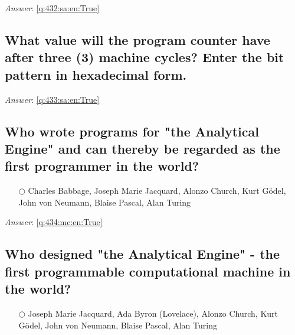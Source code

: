 \documentclass[a4paper,11pt,oneside]{article}
\begin{document}
\begin{sloppypar}
\label{q:432:sa:en:False}

\vspace{2cm}

\noindent\makebox[\textwidth]{\hrulefill}

\vspace{1cm}

\textit{Answer}: \autoref{q:432:sa:en:True}



\subsection{What value will the program counter have after three (3) machine cycles? Enter the bit pattern in hexadecimal form.}

\label{q:433:sa:en:False}

\vspace{2cm}

\noindent\makebox[\textwidth]{\hrulefill}

\vspace{1cm}

\textit{Answer}: \autoref{q:433:sa:en:True}



\subsection{Who wrote programs for "the Analytical Engine" and can thereby be regarded as the first programmer in the world?}

\label{q:434:mc:en:False}

\begin{itemize}
  \item[$\bigcirc$] Charles Babbage, Joseph Marie Jacquard, Alonzo Church, Kurt G\"odel, John von Neumann, Blaise Pascal, Alan Turing
\end{itemize}

\vspace{1cm}

\textit{Answer}: \autoref{q:434:mc:en:True}



\subsection{Who designed "the Analytical Engine" - the first programmable computational machine in the world?}

\label{q:435:mc:en:False}

\begin{itemize}
  \item[$\bigcirc$] Joseph Marie Jacquard, Ada Byron (Lovelace), Alonzo Church, Kurt G\"odel, John von Neumann, Blaise Pascal, Alan Turing
\end{itemize}


\end{sloppypar}
\end{document}
